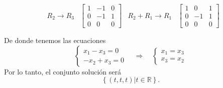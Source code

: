 \begin{enumerate}[\bfseries 1.]
$$\begin{array}{*{5}{c}}
	& R_2\to R_3&
	\left[\begin{array}{*{3}{r}}
	    1 & -1 & 0\\
	    0 & -1 & 1\\
	    0 & 0 & 0
	\end{array}\right] 
	& R_2+R_1\to R_1&
	\left[\begin{array}{*{3}{r}}
	    1 & 0 & 1\\
	    0 & -1 & 1\\
	    0 & 0 & 0
	\end{array}\right]\\\\

	\end{array}
	$$
	De donde tenemos las ecuaciones
	$$
	\left\{\begin{array}{rcl}
	    x_1-x_3=0\\
	    -x_2+x_3=0
	\end{array}\right. \quad \Rightarrow \quad
	\left\{\begin{array}{rcl}
		x_1=x_3\\
		x_3=x_2
	\end{array}\right.
	$$
	Por lo tanto, el conjunto solución será
	$$\left\{(t,t,t)|t\in \mathbb{R}\right\}.$$\\


\end{enumerate}
